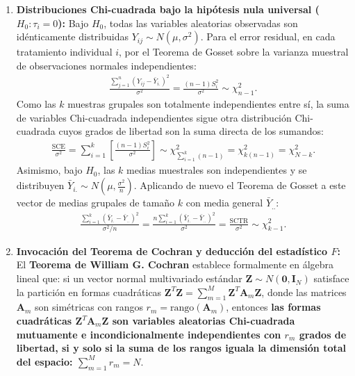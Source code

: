 \begin{solproblema}
\begin{enumerate}
		\item \textbf{Distribuciones Chi-cuadrada bajo la hipótesis nula universal ($H_0: \tau_i = 0$):}
		Bajo $H_0$, todas las variables aleatorias observadas son idénticamente distribuidas $Y_{ij} \sim N(\mu, \sigma^2)$.
		Para el error residual, en cada tratamiento individual $i$, por el Teorema de Gosset sobre la varianza muestral de observaciones normales independientes:
		\begin{align}
			\frac{\sum_{j=1}^n (Y_{ij} - \bar{Y}_{i.})^2}{\sigma^2} = \frac{(n-1)S_i^2}{\sigma^2} \sim \chi^2_{n-1}.
		\end{align}
		Como las $k$ muestras grupales son totalmente independientes entre sí, la suma de variables Chi-cuadrada independientes sigue otra distribución Chi-cuadrada cuyos grados de libertad son la suma directa de los sumandos:
		\begin{align}
			\frac{\text{SCE}}{\sigma^2} = \sum_{i=1}^k \left[ \frac{(n-1)S_i^2}{\sigma^2} \right] \sim \chi^2_{\sum_{i=1}^k (n-1)} = \chi^2_{k(n-1)} = \chi^2_{N-k}.
		\end{align}
		Asimismo, bajo $H_0$, las $k$ medias muestrales son independientes y se distribuyen $\bar{Y}_{i.} \sim N\left(\mu, \frac{\sigma^2}{n}\right)$. Aplicando de nuevo el Teorema de Gosset a este vector de medias grupales de tamaño $k$ con media general $\bar{Y}_{..}$:
		\begin{align}
			\frac{\sum_{i=1}^k (\bar{Y}_{i.} - \bar{Y}_{..})^2}{\sigma^2 / n} = \frac{n \sum_{i=1}^k (\bar{Y}_{i.} - \bar{Y}_{..})^2}{\sigma^2} = \frac{\text{SCTR}}{\sigma^2} \sim \chi^2_{k-1}.
		\end{align}
		
		\item \textbf{Invocación del Teorema de Cochran y deducción del estadístico $F$:}
		El \textbf{Teorema de William G. Cochran} establece formalmente en álgebra lineal que: si un vector normal multivariado estándar $\mathbf{Z} \sim N(\mathbf{0}, \mathbf{I}_N)$ satisface la partición en formas cuadráticas $\mathbf{Z}^T \mathbf{Z} = \sum_{m=1}^M \mathbf{Z}^T \mathbf{A}_m \mathbf{Z}$, donde las matrices $\mathbf{A}_m$ son simétricas con rangos $r_m = \text{rango}(\mathbf{A}_m)$, entonces \textbf{las formas cuadráticas $\mathbf{Z}^T \mathbf{A}_m \mathbf{Z}$ son variables aleatorias Chi-cuadrada mutuamente e incondicionalmente independientes con $r_m$ grados de libertad, si y solo si la suma de los rangos iguala la dimensión total del espacio: $\sum_{m=1}^M r_m = N$}.
		

\end{enumerate}
\end{solproblema}
